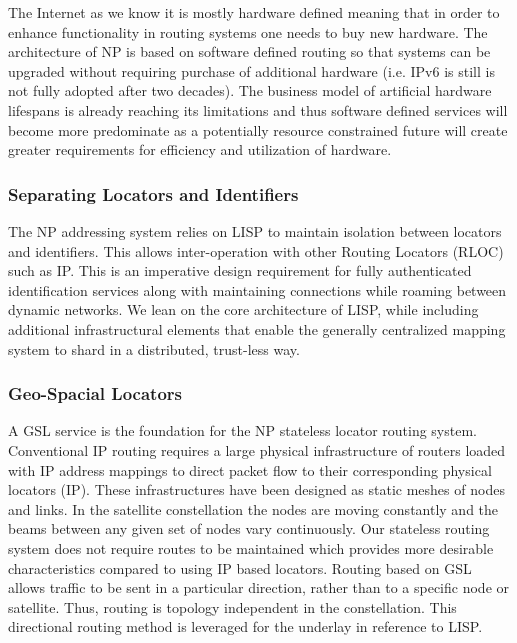 \documentclass[11pt]{article}
\begin{document}
The Internet as we know it is mostly hardware defined meaning that in order to enhance functionality in routing systems one needs to buy new hardware.
The architecture of NP is based on software defined routing so that systems can be upgraded without requiring purchase of additional hardware (i.e. IPv6 is still is not fully adopted after two decades).
The business model of artificial hardware lifespans is already reaching its limitations and thus software defined services will become more predominate as a potentially resource constrained future will create greater requirements for efficiency and utilization of hardware.


\subsubsection{Separating Locators and Identifiers}

The NP addressing system relies on LISP to maintain isolation between locators and identifiers.
This allows inter-operation with other Routing Locators (RLOC) such as IP.
This is an imperative design requirement for fully authenticated identification services along with maintaining connections while roaming between dynamic networks.
We lean on the core architecture of LISP, while including additional infrastructural elements that enable the generally centralized mapping system to shard in a distributed, trust-less way.


\subsubsection{Geo-Spacial Locators}
\label{4.5.2}

A GSL service is the foundation for the NP stateless locator routing system.
Conventional IP routing requires a large physical infrastructure of routers loaded with IP address mappings to direct packet flow to their corresponding physical locators (IP). 
These infrastructures have been designed as static meshes of nodes and links. 
In the satellite constellation the nodes are moving constantly and the beams between any given set of nodes vary continuously. 
Our stateless routing system does not require routes to be maintained which provides more desirable characteristics compared to using IP based locators.
Routing based on GSL allows traffic to be sent in a particular direction, rather than to a specific node or satellite. Thus, routing is topology independent in the constellation. 
This directional routing method is leveraged for the underlay in reference to LISP. 
\end{document}
